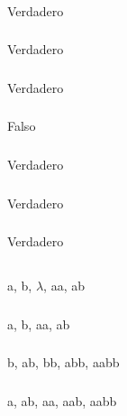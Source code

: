 \subsubsection{}
Verdadero

\subsubsection{}
Verdadero

\subsubsection{}
Verdadero

\subsubsection{}
Falso

\subsubsection{}
Verdadero

\subsubsection{}
Verdadero

\subsubsection{}
Verdadero

\subsection{}
\subsubsection{}
a, b, $\lambda$, aa, ab

\subsubsection{}
a, b, aa, ab

\subsubsection{}
b, ab, bb, abb, aabb

\subsubsection{}
a, ab, aa, aab, aabb


